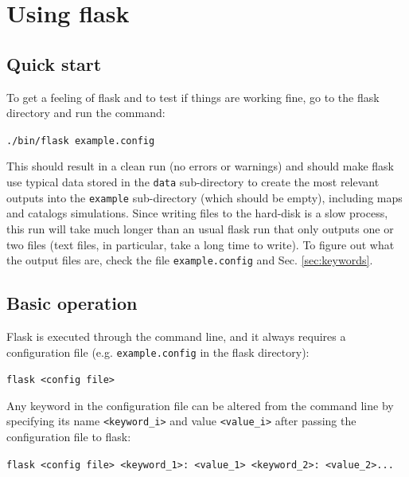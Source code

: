 \documentclass[12pt]{book} %
\begin{document}
\section{Using {\sc flask}}
\label{sec:flask}

\subsection{Quick start}
\label{sec:quick-start}

To get a feeling of {\sc flask} and to test if things are working fine, go to the {\sc flask} 
directory and run the command:

\vspace{0.5cm}
\noindent
{\tt ./bin/flask example.config}
\vspace{0.5cm}

\noindent
This should result in a clean run (no errors or warnings) and should make {\sc flask} 
use typical data stored in the {\tt data} sub-directory to create 
the most relevant outputs into the {\tt example} sub-directory (which should be empty), 
including maps and catalogs simulations. Since writing files to the hard-disk is a slow process, 
this run will take much longer than an usual {\sc flask} run that only outputs one or two files 
(text files, in particular, take a long time to write). 
To figure out what the output files are, check the file {\tt example.config} and Sec. 
\ref{sec:keywords}.
 
\subsection{Basic operation}
\label{sec:operation}

{\sc Flask} is executed through the command line, and it always requires a configuration file 
(e.g. {\tt example.config} in the {\sc flask} directory):

\vspace{0.5cm}
\noindent
{\tt flask <config file>}
\vspace{0.5cm}

Any keyword in the configuration file can be altered from the command line by specifying its 
name {\tt<keyword\_i>} and value {\tt<value\_i>} after passing the configuration file to {\sc flask}: 

\vspace{0.5cm}
\noindent
{\tt flask <config file> <keyword\_1>: <value\_1> <keyword\_2>: <value\_2>...}
\vspace{0.5cm}
\end{document}

